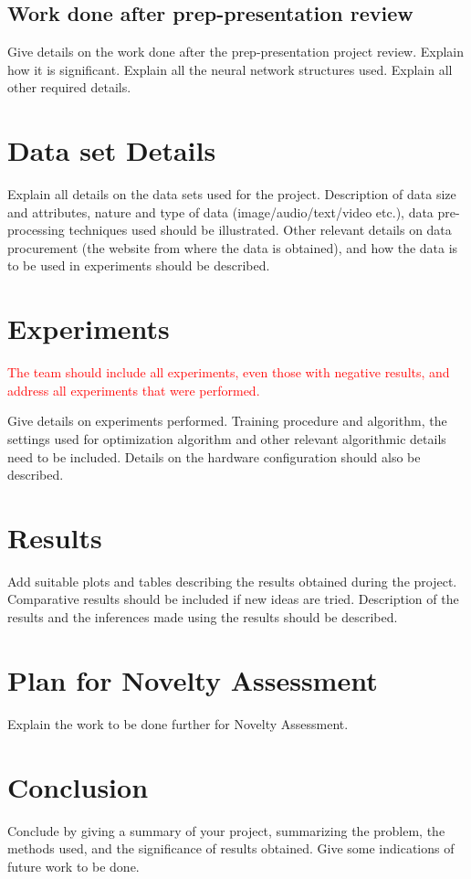 \documentclass[twoside,english]{article}
\begin{document}
\subsection{Work done after prep-presentation review} 

Give details on the work done after the prep-presentation project review. Explain how it is significant. Explain all the neural network structures used. Explain all other required details.

\section{Data set Details} \label{sec:data}

Explain all details  on the data sets used for the project. Description of data size and attributes, nature and type of data (image/audio/text/video etc.), data pre-processing techniques used should be illustrated. Other relevant details on data procurement (the website from where the data is obtained), and how the data is to be used in experiments should be described. 

\section{Experiments} \label{sec:exp}

\textcolor{red}{The team should include all experiments, even those with negative results, and address all experiments that were performed.}


Give details on experiments performed. Training procedure and algorithm, the settings used for optimization algorithm and other relevant algorithmic details need to be included. Details on the hardware configuration should also be described. 


\section{Results}\label{sec:results}

Add suitable plots and tables describing the results obtained during the project. Comparative results should be included if new ideas are tried. Description of the results and the inferences made using the results should be described. 

\section{Plan for Novelty Assessment} \label{sec:Plan for Novelty Assessment}

Explain the work to be done further for Novelty Assessment. 

\section{Conclusion} \label{sec:conclusion}

Conclude by giving a summary of your project, summarizing the problem, the methods used, and the significance of results obtained. Give some indications of future work to be done. 


\end{document}
